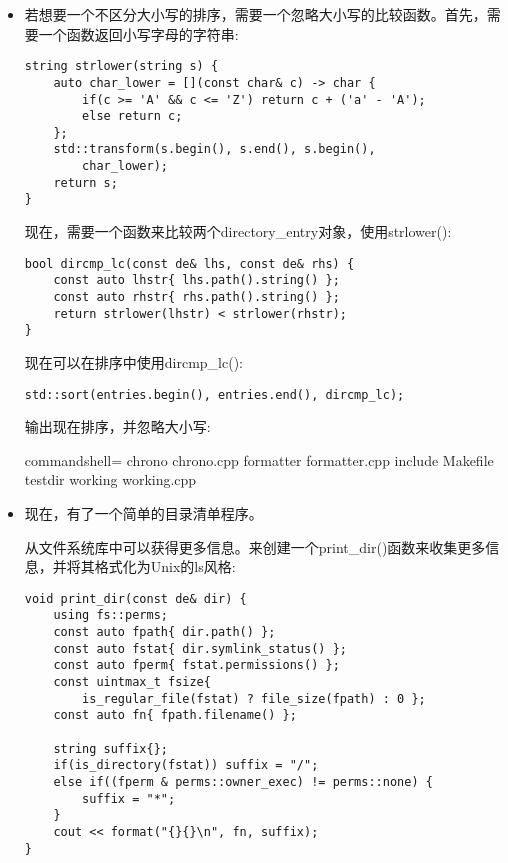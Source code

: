 \begin{itemize}
\item 
若想要一个不区分大小写的排序，需要一个忽略大小写的比较函数。首先，需要一个函数返回小写字母的字符串:

\begin{lstlisting}[style=styleCXX]
string strlower(string s) {
	auto char_lower = [](const char& c) -> char {
		if(c >= 'A' && c <= 'Z') return c + ('a' - 'A');
		else return c;
	};
	std::transform(s.begin(), s.end(), s.begin(),
		char_lower);
	return s;
}
\end{lstlisting}

现在，需要一个函数来比较两个directory\_entry对象，使用strlower():

\begin{lstlisting}[style=styleCXX]
bool dircmp_lc(const de& lhs, const de& rhs) {
	const auto lhstr{ lhs.path().string() };
	const auto rhstr{ rhs.path().string() };
	return strlower(lhstr) < strlower(rhstr);
}
\end{lstlisting}

现在可以在排序中使用dircmp\_lc():

\begin{lstlisting}[style=styleCXX]
std::sort(entries.begin(), entries.end(), dircmp_lc);
\end{lstlisting}

输出现在排序，并忽略大小写:

\begin{tcblisting}{commandshell={}}
chrono chrono.cpp formatter formatter.cpp include
Makefile testdir working working.cpp
\end{tcblisting}

\item 
现在，有了一个简单的目录清单程序。

从文件系统库中可以获得更多信息。来创建一个print\_dir()函数来收集更多信息，并将其格式化为Unix的ls风格:

\begin{lstlisting}[style=styleCXX]
void print_dir(const de& dir) {
	using fs::perms;
	const auto fpath{ dir.path() };
	const auto fstat{ dir.symlink_status() };
	const auto fperm{ fstat.permissions() };
	const uintmax_t fsize{
		is_regular_file(fstat) ? file_size(fpath) : 0 };
	const auto fn{ fpath.filename() };
	
	string suffix{};
	if(is_directory(fstat)) suffix = "/";
	else if((fperm & perms::owner_exec) != perms::none) {
		suffix = "*";
	}
	cout << format("{}{}\n", fn, suffix);
}
\end{lstlisting}


\end{itemize}

